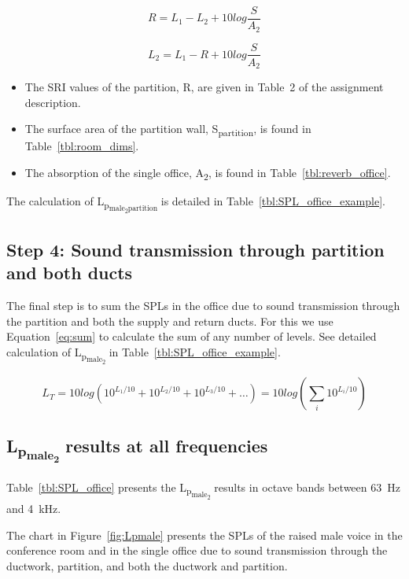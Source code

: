 	\begin{equation}\label{eq:SRI}
		R = L_1 - L_2 + 10 log \frac{S}{A_2}
	\end{equation}
	
	
	\begin{equation}\label{eq:SRI_rearranged}
		L_2 = L_1 - R + 10 log \frac{S}{A_2}
	\end{equation}

\begin{itemize}
	\item The SRI values of the partition, R, are given in Table~2 of the assignment description.
	\item The surface area of the partition wall, S\textsubscript{partition}, is found in Table~\ref{tbl:room_dims}.
	\item The absorption of the single office, A\textsubscript{2}, is found in Table~\ref{tbl:reverb_office}.
\end{itemize}

The calculation of L\textsubscript{p\textsubscript{male\textsubscript{2}partition}} is detailed in Table~\ref{tbl:SPL_office_example}.



\subsection{Step 4: Sound transmission through partition and both ducts}

The final step is to sum the SPLs in the office due to sound transmission through the partition and both the supply and return ducts.
For this we use Equation~\ref{eq:sum} to calculate the sum of any number of levels.
See detailed calculation of L\textsubscript{p\textsubscript{male\textsubscript{2}}} in Table~\ref{tbl:SPL_office_example}.

	\begin{equation}\label{eq:sum}
		L_T = 10 log \left(10^{L_1/10} + 10^{L_2/10} + 10^{L_3/10} + \ldots\right) = 10 log \left(\sum_{i}10^{L_i/10}\right)
	\end{equation}



\subsection{L\textsubscript{p\textsubscript{male\textsubscript{2}}} results at all frequencies}

Table~\ref{tbl:SPL_office} presents the L\textsubscript{p\textsubscript{male\textsubscript{2}}} results in octave bands between 63~Hz and 4~kHz.

The chart in Figure~\ref{fig:Lpmale} presents the SPLs of the raised male voice in the conference room and in the single office due to sound transmission through the ductwork, partition, and both the ductwork and partition.





